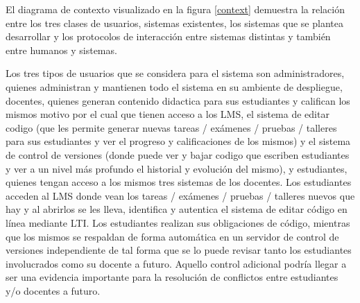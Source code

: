El diagrama de contexto visualizado en la figura \ref{context} demuestra la relación entre los tres clases de usuarios, sistemas existentes, los sistemas que se plantea desarrollar y los protocolos de interacción entre sistemas distintas y también entre humanos y sistemas.

    
Los tres tipos de usuarios que se considera para el sistema son administradores, quienes administran y mantienen todo el sistema en su ambiente de despliegue, docentes, quienes generan contenido didactica para sus estudiantes y califican los mismos motivo por el cual que tienen acceso a los LMS, el sistema de editar codigo (que les permite generar nuevas tareas / exámenes / pruebas / talleres para sus estudiantes y ver el progreso y calificaciones de los mismos) y el sistema de control de versiones (donde puede ver y bajar codigo que escriben estudiantes y ver a un nivel más profundo el historial y evolución del mismo), y estudiantes, quienes tengan acceso a los mismos tres sistemas de los docentes. Los estudiantes acceden al LMS  donde vean los tareas / exámenes / pruebas / talleres nuevos que hay y al abrirlos se les lleva, identifica y autentica el sistema de editar código en línea mediante LTI. Los estudiantes realizan sus obligaciones de código, mientras que los mismos se respaldan de forma automática en un servidor de control de versiones independiente de tal forma que se lo puede revisar tanto los estudiantes involucrados como su docente a futuro. Aquello control adicional podría llegar a ser una evidencia importante para la resolución de conflictos entre estudiantes y/o docentes a futuro.

